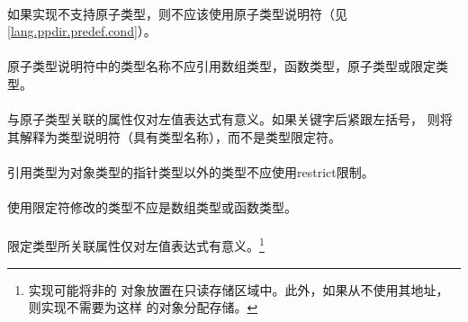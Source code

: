 {

\syntax
\paragraph{}

\constraint
\paragraph{}
如果实现不支持原子类型，则不应该使用原子类型说明符（见
\ref{lang.ppdir.predef.cond}）。

\paragraph{}
原子类型说明符中的类型名称不应引用数组类型，函数类型，原子类型或限定类型。

\semantic
\paragraph{}
与原子类型关联的属性仅对左值表达式有意义。如果关键字后紧跟左括号，
则将其解释为类型说明符（具有类型名称），而不是类型限定符。

\syntax
\paragraph{}

\constraint
\paragraph{}
引用类型为对象类型的指针类型以外的类型不应使用restrict限制。

\paragraph{}
使用限定符修改的类型不应是数组类型或函数类型。

\semantic
\paragraph{}
限定类型所关联属性仅对左值表达式有意义。\footnote{实现可能将非的
对象放置在只读存储区域中。此外，如果从不使用其地址，则实现不需要为这样
的对象分配存储。}

}

